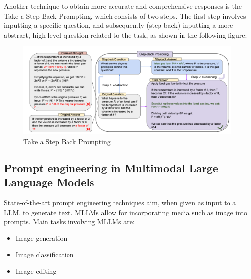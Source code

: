 Another technique to obtain more accurate and comprehensive responses is the Take a Step Back Prompting\cite{zheng2023take}, which consists of two steps. The first step involves inputting a specific question, and subsequently (step-back) inputting a more abstract, high-level question related to the task, as shown in the following figure:
\begin{figure}[H]
    \centering
    \includegraphics[width=0.9\linewidth]{Figures/fig_9.png}
    \caption{Take a Step Back Prompting}
    \label{fig:9}
\end{figure}

\subsection{Prompt engineering in Multimodal Large Language Models}
State-of-the-art prompt engineering techniques aim, when given as input to a LLM, to generate text.
MLLMs allow for incorporating media such as image into prompts.
Main tasks involving MLLMs are:
\begin{itemize}
    \item Image generation
    \item Image classification
    \item Image editing
\end{itemize}

